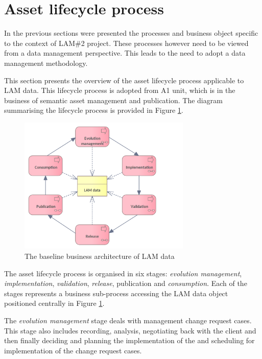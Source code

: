 	\section{Asset lifecycle process}
	\label{sec:asset-lifecycle}
	
	In the previous sections were presented the processes and business object specific to the context of LAM\#2 project. These processes however need to be viewed from a data management perspective. This leads to the need to adopt a data management methodology. 
	
	This section presents the overview of the asset lifecycle process applicable to LAM data. This lifecycle process is adopted from A1 unit, which is in the business of semantic asset management and publication. The diagram summarising the lifecycle process is provided in Figure \ref{fig:lifecycle-overview}. 
	
	\begin{figure}[!h]
		\centering
		\includegraphics[width=0.73\textwidth]{images/business/lifecycle/Lyfecycle overview.png}
		\caption{The baseline business architecture of LAM data}
		\label{fig:lifecycle-overview}
	\end{figure} 

	The asset lifecycle process is organised in six stages: \textit{evolution management}, \textit{implementation}, \textit{validation}, \textit{release}, publication and \textit{consumption}. Each of the stages represents a business sub-process accessing the LAM data object positioned centrally in Figure \ref{fig:lifecycle-overview}.
	
	The \textit{evolution management} stage deals with management change request cases. This stage also includes recording, analysis, negotiating back with the client and
then finally deciding and planning the implementation of the and scheduling for implementation of the change request cases.
	
